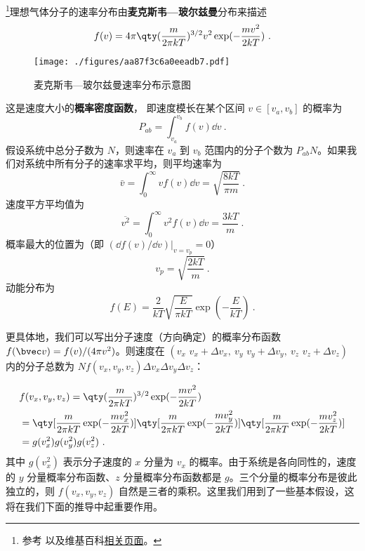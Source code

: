 \footnote{参考 \cite{新热} 以及维基百科\href{https://en.wikipedia.org/wiki/Maxwell-Boltzmann_distribution}{相关页面}。}理想气体分子的速率分布由\textbf{麦克斯韦—玻尔兹曼}分布来描述
\begin{equation}
f(v) = 4\pi \qty(\frac{m}{2\pi kT})^{3/2} v^2 \exp(-\frac{mv^2}{2kT})~.
\end{equation}
\begin{figure}[ht]
\centering
\texttt{[image: ./figures/aa87f3c6a0eeadb7.pdf]}
\caption{麦克斯韦—玻尔兹曼速率分布示意图} \label{fig_MxwBzm_1}
\end{figure}
这是速度大小的\textbf{概率密度函数}， 即速度模长在某个区间 $v \in [v_a, v_b]$ 的概率为
\begin{equation}
P_{ab} = \int_{v_a}^{v_b} f(v) \dd{v}~.
\end{equation}
假设系统中总分子数为 $N$，则速率在 $v_a$ 到 $v_b$ 范围内的分子个数为 $P_{ab}N$。如果我们对系统中所有分子的速率求平均，则平均速率为
\begin{equation}
\bar v = \int_{0}^\infty v f(v)\dd v= \sqrt{\frac{8kT}{\pi m}}~.
\end{equation}
速度平方平均值为
\begin{equation}\label{eq_MxwBzm_1}
\overline {v^2} = \int_{0}^\infty v^2 f(v)\dd v = \frac{3kT}{m}~.
\end{equation}
概率最大的位置为（即 $(\dd f(v)/\dd v)|_{v=v_p}=0$）
\begin{equation}
v_p =\sqrt{\frac{2kT}{m}}~.
\end{equation}
动能分布为
\begin{equation}
f(E) = \frac{2}{kT}\sqrt{\frac{E}{\pi kT}} \exp(-\frac{E}{kT})~.
\end{equation}

更具体地，我们可以写出分子速度（方向确定）的概率分布函数 $f(\bvec v)=f(v)/(4\pi v^2)$。则速度在 $(v_x\text{~}v_x+\Delta v_x,\ v_y\text{~}v_y+\Delta v_y,\ v_z\text{~}v_z+\Delta v_z)$ 内的分子总数为 $N f(v_x,v_y,v_z)\Delta v_x\Delta v_y\Delta v_z$：

\begin{equation}
\begin{aligned}
&f(v_x,v_y,v_z)=\qty(\frac{m}{2\pi k T})^{3/2}\exp(-\frac{mv^2}{2kT})\\
&=\qty[\frac{m}{2\pi kT}\exp(-\frac{mv_x^2}{2kT})]\qty[\frac{m}{2\pi kT}\exp(-\frac{mv_y^2}{2kT})]\qty[\frac{m}{2\pi kT}\exp(-\frac{mv_z^2}{2kT})]\\
&=g(v_x^2)g(v_y^2)g(v_z^2)~.
\end{aligned}
\end{equation}
其中 $g(v_x^2)$ 表示分子速度的 $x$ 分量为 $v_x$ 的概率。由于系统是各向同性的，速度的 $y$ 分量概率分布函数、$z$ 分量概率分布函数都是 $g$。三个分量的概率分布是彼此独立的，则 $f(v_x,v_y,v_z)$ 自然是三者的乘积。这里我们用到了一些基本假设，这将在我们下面的推导中起重要作用。

